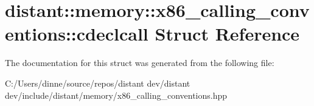 \hypertarget{structdistant_1_1memory_1_1x86__calling__conventions_1_1cdeclcall}{}\section{distant\+:\+:memory\+:\+:x86\+\_\+calling\+\_\+conventions\+:\+:cdeclcall Struct Reference}
\label{structdistant_1_1memory_1_1x86__calling__conventions_1_1cdeclcall}


The documentation for this struct was generated from the following file\+:\begin{DoxyCompactItemize}
\item 
C\+:/\+Users/dinne/source/repos/distant dev/distant dev/include/distant/memory/x86\+\_\+calling\+\_\+conventions.\+hpp\end{DoxyCompactItemize}

